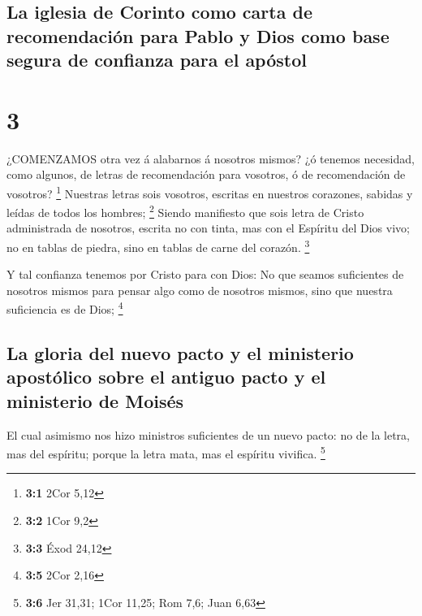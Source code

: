 \hypertarget{la-iglesia-de-corinto-como-carta-de-recomendaciuxf3n-para-pablo-y-dios-como-base-segura-de-confianza-para-el-apuxf3stol}{%
\subsection{La iglesia de Corinto como carta de recomendación para Pablo
y Dios como base segura de confianza para el
apóstol}\label{la-iglesia-de-corinto-como-carta-de-recomendaciuxf3n-para-pablo-y-dios-como-base-segura-de-confianza-para-el-apuxf3stol}}

\hypertarget{section-2}{%
\section{3}\label{section-2}}

 ¿COMENZAMOS otra vez á alabarnos á nosotros mismos? ¿ó
tenemos necesidad, como algunos, de letras de recomendación para
vosotros, ó de recomendación de vosotros? \footnote{\textbf{3:1} 2Cor
  5,12}  Nuestras letras sois vosotros, escritas en nuestros
corazones, sabidas y leídas de todos los hombres; \footnote{\textbf{3:2}
  1Cor 9,2}  Siendo manifiesto que sois letra de Cristo
administrada de nosotros, escrita no con tinta, mas con el Espíritu del
Dios vivo; no en tablas de piedra, sino en tablas de carne del corazón.
\footnote{\textbf{3:3} Éxod 24,12}

 Y tal confianza tenemos por Cristo para con Dios:
 No que seamos suficientes de nosotros mismos para pensar
algo como de nosotros mismos, sino que nuestra suficiencia es de Dios;
\footnote{\textbf{3:5} 2Cor 2,16}

\hypertarget{la-gloria-del-nuevo-pacto-y-el-ministerio-apostuxf3lico-sobre-el-antiguo-pacto-y-el-ministerio-de-moisuxe9s}{%
\subsection{La gloria del nuevo pacto y el ministerio apostólico sobre
el antiguo pacto y el ministerio de
Moisés}\label{la-gloria-del-nuevo-pacto-y-el-ministerio-apostuxf3lico-sobre-el-antiguo-pacto-y-el-ministerio-de-moisuxe9s}}

 El cual asimismo nos hizo ministros suficientes de un nuevo
pacto: no de la letra, mas del espíritu; porque la letra mata, mas el
espíritu vivifica. \footnote{\textbf{3:6} Jer 31,31; 1Cor 11,25; Rom
  7,6; Juan 6,63}

